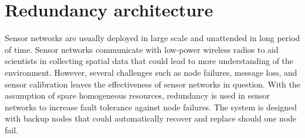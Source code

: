 \section{Redundancy architecture}


Sensor networks are usually deployed in large scale and unattended in long
period of time. Sensor networks communicate with
low-power wireless radios to aid scientists in collecting spatial data that
could lead to more understanding of the environment. However, several
challenges such as node failures, message loss, and sensor calibration leaves
the effectiveness of sensor networks in question. With the assumption of spare
homogeneous resources, redundancy is used in sensor networks to increase fault
tolerance against node failures. The system is designed with backup nodes that
could automatically recover and replace should one node fail.

